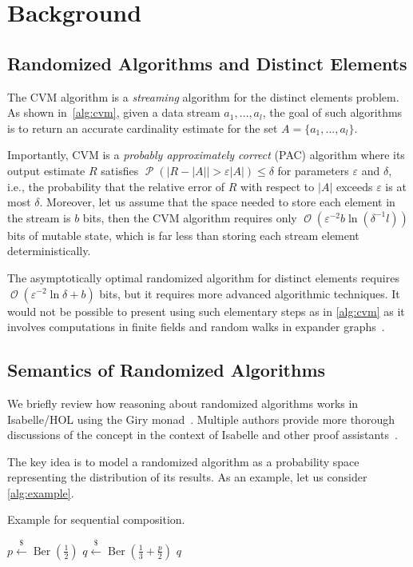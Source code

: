 \documentclass[a4paper,UKenglish,cleveref, autoref, thm-restate]{lipics-v2021}
\newcommand{\getsr}{\xleftarrow{\$}}
\DeclareMathOperator{\Ber}{\mathrm{Ber}}
\DeclareMathOperator{\prob}{\mathcal P}
\DeclareMathOperator{\bigo}{\mathcal O}
\begin{document}
\section{Background}
\label{sec:background}

\subsection{Randomized Algorithms and Distinct Elements}

The CVM algorithm is a \emph{streaming} algorithm for the distinct elements problem.
As shown in~\cref{alg:cvm}, given a data stream $a_1,\dots, a_l$, the goal of such algorithms is to return an accurate cardinality estimate for the set $A = \{a_1,\dots,a_l\}$.

Importantly, CVM is a \emph{probably approximately correct} (PAC) algorithm where its output estimate $R$ satisfies
$\prob \left( |R - |A| | > \varepsilon |A| \right) \leq \delta$
for parameters $\varepsilon$ and $\delta$,
i.e., the probability that the relative error of $R$ with respect to $|A|$ exceeds $\varepsilon$ is at most $\delta$.
Moreover, let us assume that the space needed to store each element in the stream is $b$ bits, then the CVM algorithm requires only $\bigo(\varepsilon^{-2} b \ln(\delta^{-1} l))$ bits of mutable state, which is far less than storing each stream element deterministically.

\begin{remark}
The asymptotically optimal randomized algorithm for distinct elements requires $\bigo( \varepsilon^{-2} \ln \delta + b)$ bits, but it requires more advanced algorithmic techniques. It would not be possible to present using such elementary steps as in \cref{alg:cvm} as it involves computations in finite fields and random walks in expander graphs~\cite{blasiok2020, karayel2023}.
\lipicsEnd\end{remark}

\subsection{Semantics of Randomized Algorithms}
We briefly review how reasoning about randomized algorithms works in Isabelle/HOL using the Giry monad~\cite{giry1982}.
Multiple authors provide more thorough discussions of the concept in the context of Isabelle and other proof assistants~\cite{audebaud2009,eberl2020, lochbihler2016}.

The key idea is to model a randomized algorithm as a probability space representing the distribution of its results.
As an example, let us consider \cref{alg:example}.
\begin{algorithm}[h!]
\caption{Example for sequential composition.}\label{alg:example}
\begin{algorithmic}[1]
\State $p \getsr \Ber(\frac{1}{2})$
\State $q \getsr \Ber(\frac{1}{3}+\frac{p}{2})$
\State \Return $q$
\end{algorithmic}
\end{algorithm}%
\end{document}
